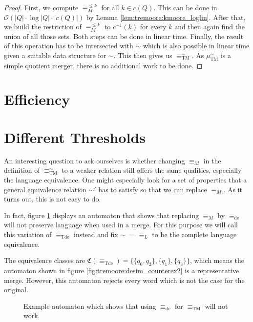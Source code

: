 \begin{proof}
	First, we compute $\equiv_M^{\leq k}$ for all $k \in c(Q)$. This can be done in $\mathcal{O}(|Q| \cdot \log |Q| \cdot |c(Q)|)$ by Lemma \ref{lem:tremoore:kmoore_loglin}. After that, we build the restriction of $\equiv_M^{\leq k}$ to $c^{-1}(k)$ for every $k$ and then again find the union of all those sets. Both steps can be done in linear time. Finally, the result of this operation has to be intersected with $\sim$ which is also possible in linear time given a suitable data structure for $\sim$. This then gives us $\equiv_\text{TM}^\sim$. As $\mu_\text{TM}^\sim$ is a simple quotient merger, there is no additional work to be done.
\end{proof}



\section{Efficiency}

\section{Different Thresholds}

An interesting question to ask ourselves is whether changing $\equiv_M$ in the definition of $\equiv_\text{TM}^\sim$ to a weaker relation still offers the same qualities, especially the language equivalence. One might especially look for a set of properties that a general equivalence relation $\sim'$ has to satisfy so that we can replace $\equiv_M$. As it turns out, this is not easy to do.

In fact, figure \ref{fig:tremoore:desim_counterex1} displays an automaton that shows that replacing $\equiv_M$ by $\equiv_\text{de}$ will not preserve language when used in a merge. For this purpose we will call this variation of $\equiv_\text{Tde}$ instead and fix $\sim \,=\, \equiv_L$ to be the complete language equivalence.

The equivalence classes are $\mathfrak{C}(\equiv_\text{Tde}) = \{ \{q_0, q_2\}, \{q_1\}, \{q_3\} \}$, which means the automaton shown in figure \ref{fig:tremoore:desim_counterex2} is a representative merge. However, this automaton rejects every word which is not the case for the original.

\begin{figure}
\centering
{}
\caption{Example automaton which shows that using $\equiv_\text{de}$ for $\equiv_\text{TM}$ will not work.}
\label{fig:tremoore:desim_counterex1}
\end{figure}

